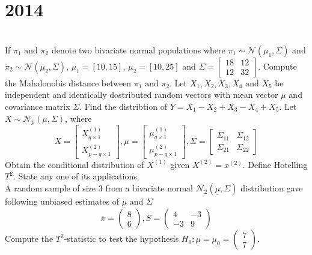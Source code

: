 \section*{2014}
\vspace{-.5cm}
\hrulefill \smallskip\\
 If $\pi_1 \text{ and } \pi_2$ denote two bivariate normal populations where $\pi_1 \sim \mathcal{N}(\mu_1,\Sigma)$ and $\pi_2 \sim \mathcal{N}(\mu_2,\Sigma)$, $\mu_1 = [10,15]$, $\mu_2=[10,25]$ and $\Sigma = \begin{bmatrix} 18 & 12 \\ 12 & 32 \end{bmatrix}$. Compute the Mahalonobis distance between $\pi_1 \text{ and } \pi_2$.
\myline
{} Let $X_1,X_2,X_3,X_4 \text{ and } X_5$ be independent and identically dostributed random vectors with mean vector $\mu$ and covariance matrix $\Sigma$. Find the distribtion of $Y = X_1 - X_2 + X_3 - X_4 + X_5$.
\myline
{} Let $X\sim \mathcal{N}_p(\mu,\Sigma)$, where
\[ X = \begin{bmatrix} X_{q\times 1}^{(1)} \\ X_{p - q\times 1}^{(2)} \end{bmatrix}, \mu = \begin{bmatrix} \mu_{q\times 1}^{(1)} \\ \mu_{p - q\times 1}^{(2)} \end{bmatrix},\Sigma = \begin{bmatrix} \Sigma_{11} & \Sigma_{12} \\\Sigma_{21} & \Sigma_{22} \end{bmatrix} \]Obtain the conditional distribution of $X^{(1)}$ given $X^{(2)} = x^{(2)}$.
\myline
{} Define Hotelling $T^2$. State any one of its applications. \\ A random sample of size 3 from a bivariate normal $\mathcal{N}_2(\underline{\mu},\Sigma)$ distribution gave following unbiased estimates of $\underline{\mu} \text{ and }\Sigma$
\[ \overline{x} = \begin{pmatrix} 8 \\ 6 \end{pmatrix}, S = \begin{pmatrix} 4 & -3 \\ -3 & 9 \end{pmatrix} \] Compute the $T^2$-statistic to test the hypothesis $H_0 : \underline{\mu} = \underline{\mu_0} = \begin{pmatrix} 7 \\ 7 \end{pmatrix}$.